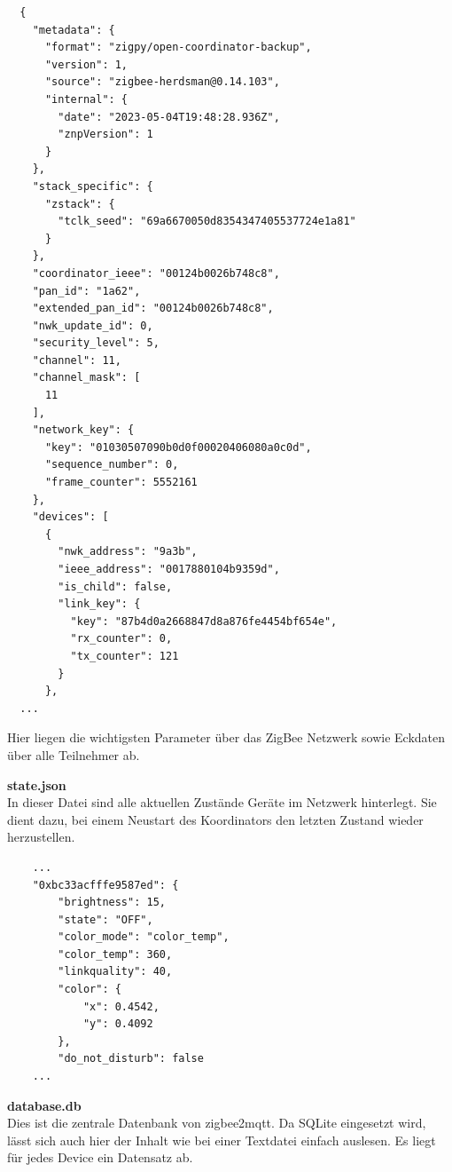 \begin{lstlisting}
  {
    "metadata": {
      "format": "zigpy/open-coordinator-backup",
      "version": 1,
      "source": "zigbee-herdsman@0.14.103",
      "internal": {
        "date": "2023-05-04T19:48:28.936Z",
        "znpVersion": 1
      }
    },
    "stack_specific": {
      "zstack": {
        "tclk_seed": "69a6670050d8354347405537724e1a81"
      }
    },
    "coordinator_ieee": "00124b0026b748c8",
    "pan_id": "1a62",
    "extended_pan_id": "00124b0026b748c8",
    "nwk_update_id": 0,
    "security_level": 5,
    "channel": 11,
    "channel_mask": [
      11
    ],
    "network_key": {
      "key": "01030507090b0d0f00020406080a0c0d",
      "sequence_number": 0,
      "frame_counter": 5552161
    },
    "devices": [
      {
        "nwk_address": "9a3b",
        "ieee_address": "0017880104b9359d",
        "is_child": false,
        "link_key": {
          "key": "87b4d0a2668847d8a876fe4454bf654e",
          "rx_counter": 0,
          "tx_counter": 121
        }
      },
  ...  
  \end{lstlisting}

  Hier liegen die wichtigsten Parameter über das ZigBee Netzwerk sowie Eckdaten über alle Teilnehmer ab.

  \textbf{state.json}\\

  In dieser Datei sind alle aktuellen Zustände Geräte im Netzwerk hinterlegt. Sie dient dazu, bei einem Neustart des Koordinators den letzten Zustand wieder herzustellen.

  \begin{lstlisting}
    ...
    "0xbc33acfffe9587ed": {
        "brightness": 15,
        "state": "OFF",
        "color_mode": "color_temp",
        "color_temp": 360,
        "linkquality": 40,
        "color": {
            "x": 0.4542,
            "y": 0.4092
        },
        "do_not_disturb": false
    ...
  \end{lstlisting}
  \textbf{database.db}\\

  Dies ist die zentrale Datenbank von zigbee2mqtt. Da SQLite eingesetzt wird, lässt sich auch hier der Inhalt wie bei einer Textdatei einfach auslesen.
  Es liegt für jedes Device ein Datensatz ab.


